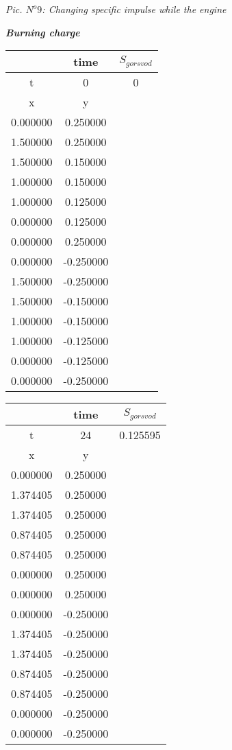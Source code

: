 \begin{flushright}
\textit{Pic. $N^o 9$: Changing specific impulse while the engine}\\
\end{flushright}
\begin{center}
\begin{large}
\textbf{\textit {Burning charge}}\\
\end{large}
\begin{tabular}{|c|c|c|}
\hline
  & time & $S_{gor svod}$  \\
\hline
t & 0 & 0  \\
\hline
x & y &   \\
\hline
0.000000 & 0.250000 &   \\
\hline
1.500000 & 0.250000 &   \\
\hline
1.500000 & 0.150000 &   \\
\hline
1.000000 & 0.150000 &   \\
\hline
1.000000 & 0.125000 &   \\
\hline
0.000000 & 0.125000 &   \\
\hline
0.000000 & 0.250000 &   \\
\hline
0.000000 & -0.250000 &   \\
\hline
1.500000 & -0.250000 &   \\
\hline
1.500000 & -0.150000 &   \\
\hline
1.000000 & -0.150000 &   \\
\hline
1.000000 & -0.125000 &   \\
\hline
0.000000 & -0.125000 &   \\
\hline
0.000000 & -0.250000 &   \\
\hline
\end{tabular}
\begin{tabular}{|c|c|c|}
\hline
  & time & $S_{gor svod}$  \\
\hline
t & 24 & 0.125595  \\
\hline
x & y &   \\
\hline
0.000000 & 0.250000 &   \\
\hline
1.374405 & 0.250000 &   \\
\hline
1.374405 & 0.250000 &   \\
\hline
0.874405 & 0.250000 &   \\
\hline
0.874405 & 0.250000 &   \\
\hline
0.000000 & 0.250000 &   \\
\hline
0.000000 & 0.250000 &   \\
\hline
0.000000 & -0.250000 &   \\
\hline
1.374405 & -0.250000 &   \\
\hline
1.374405 & -0.250000 &   \\
\hline
0.874405 & -0.250000 &   \\
\hline
0.874405 & -0.250000 &   \\
\hline
0.000000 & -0.250000 &   \\
\hline
0.000000 & -0.250000 &   \\
\hline
\end{tabular}\\
\end{center}
